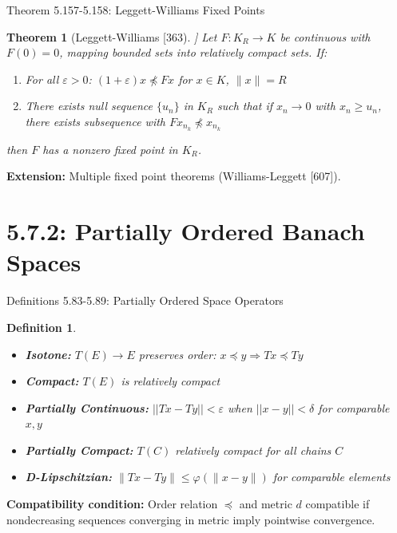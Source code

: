 \documentclass[aspectratio=169,10pt]{beamer}
\theoremstyle{plain}
\newtheorem*{theorem*}{Theorem}
\newtheorem*{definition*}{Definition}
\begin{document}
\begin{frame}{Theorem 5.157-5.158: Leggett-Williams Fixed Points}
  \begin{theorem*}[Leggett-Williams [363]]
    Let $F: K_R \to K$ be continuous with $F(0) = 0$, mapping bounded sets
    into relatively compact sets. If:
    \begin{enumerate}
      \item For all $\varepsilon > 0$: $(1+\varepsilon)x \not\preceq Fx$ for $x \in K$, $\|x\| = R$
      \item There exists null sequence $\{u_n\}$ in $K_R$ such that if $x_n \to 0$ with
      $x_n \geq u_n$, there exists subsequence with $Fx_{n_k} \not\preceq x_{n_k}$
    \end{enumerate}

    then $F$ has a nonzero fixed point in $K_R$.
  \end{theorem*}

  \vspace{1em}

  \textbf{Extension:} Multiple fixed point theorems (Williams-Leggett [607]).
\end{frame}

\section{5.7.2: Partially Ordered Banach Spaces}

\begin{frame}{Definitions 5.83-5.89: Partially Ordered Space Operators}
  \begin{definition*}
    \begin{itemize}
      \item \textbf{Isotone:} $T(E) \to E$ preserves order: $x \preceq y \Rightarrow Tx \preceq Ty$
      \item \textbf{Compact:} $T(E)$ is relatively compact
      \item \textbf{Partially Continuous:} $||Tx - Ty|| < \varepsilon$ when $||x-y|| < \delta$ for comparable $x,y$
      \item \textbf{Partially Compact:} $T(C)$ relatively compact for all chains $C$
      \item \textbf{D-Lipschitzian:} $\|Tx - Ty\| \leq \varphi(\|x - y\|)$ for comparable elements
    \end{itemize}
  \end{definition*}

  \vspace{1em}

  \textbf{Compatibility condition:} Order relation $\preceq$ and metric $d$ compatible if
  nondecreasing sequences converging in metric imply pointwise convergence.
\end{frame}
\end{document}
